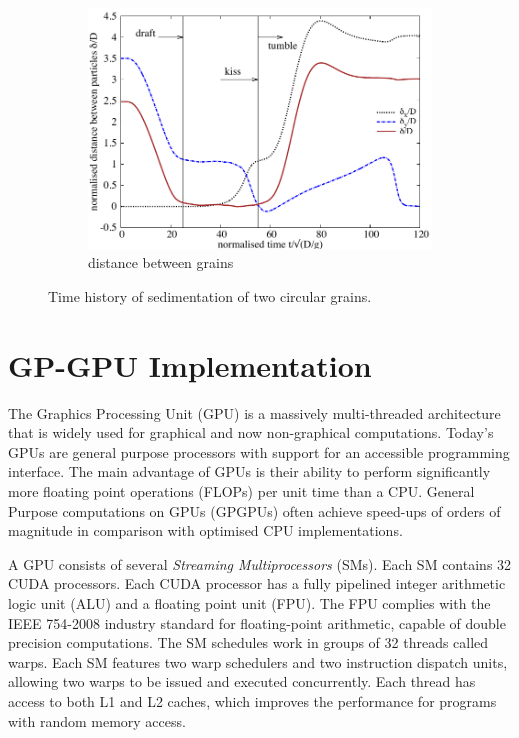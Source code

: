\begin{figure}[tbhp]
\begin{subfigure}[b]{0.475\textwidth}
		\includegraphics[width=\textwidth]{Kissing_delta}
		\caption{distance between grains}
		\label{fig:kissdelta}
	\end{subfigure}
	\caption{Time history of sedimentation of two circular grains.}
	\label{fig:kiss}
\end{figure}

\section{GP-GPU Implementation}

The Graphics Processing Unit (GPU) is a massively multi-threaded architecture 
that is widely used for graphical and now non-graphical computations. Today's 
GPUs are general purpose processors with support for an accessible programming 
interface. The main advantage of GPUs is their ability to perform significantly 
more floating point operations (FLOPs) per unit time than a CPU. General 
Purpose computations on GPUs (GPGPUs) often achieve speed-ups of orders of 
magnitude in comparison with optimised CPU implementations. 

A GPU consists of several \emph{Streaming Multiprocessors} (SMs). Each SM 
contains 32 CUDA processors. Each CUDA processor has a fully pipelined integer 
arithmetic logic unit (ALU) and a floating point unit (FPU). The FPU complies 
with the IEEE 754-2008 industry standard for floating-point arithmetic, capable 
of double precision computations. The SM schedules work in groups of 32 threads 
called warps. Each SM features two warp schedulers and two instruction dispatch 
units, allowing two warps to be issued and executed concurrently. Each thread 
has access to both L1 and L2 caches, which improves the performance for 
programs with random memory access.

